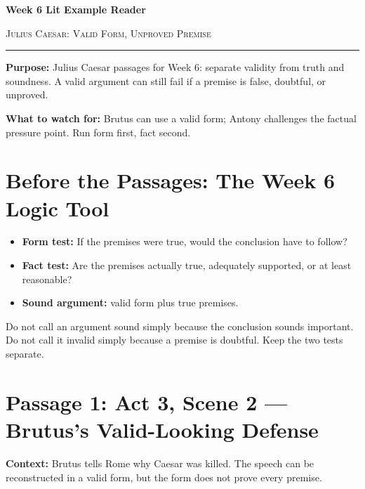 \documentclass[12pt]{article}
\begin{document}
\begin{center}
{\LARGE\bfseries Week 6 Lit Example Reader}\par\vspace{0.03em}
{\large\scshape Julius Caesar: Valid Form, Unproved Premise}\par\vspace{0.1em}
\rule{0.78\textwidth}{0.5pt}
\end{center}

\textbf{Purpose:} Julius Caesar passages for Week 6: separate validity from truth and soundness. A valid argument can still fail if a premise is false, doubtful, or unproved.

\textbf{What to watch for:} Brutus can use a valid form; Antony challenges the factual pressure point. Run form first, fact second.

\section*{Before the Passages: The Week 6 Logic Tool}

\begin{itemize}[leftmargin=1.4em,itemsep=0.12em,topsep=0.15em,parsep=0.05em]
\item \textbf{Form test:} If the premises were true, would the conclusion have to follow?
\item \textbf{Fact test:} Are the premises actually true, adequately supported, or at least reasonable?
\item \textbf{Sound argument:} valid form plus true premises.
\end{itemize}

Do not call an argument sound simply because the conclusion sounds important. Do not call it invalid simply because a premise is doubtful. Keep the two tests separate.

\section*{Passage 1: Act 3, Scene 2 --- Brutus's Valid-Looking Defense}

\textbf{Context:} Brutus tells Rome why Caesar was killed. The speech can be reconstructed in a valid form, but the form does not prove every premise.
\end{document}
